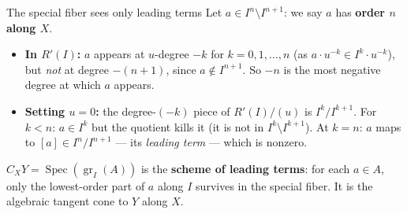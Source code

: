 \documentclass[aspectratio=169,12pt]{beamer}
\newenvironment{mathbox}{%
  \begin{tcolorbox}[mathbox]}{%
  \end{tcolorbox}}
\begin{document}
\begin{frame}{The special fiber sees only leading terms}
  Let $a \in I^n \setminus I^{n+1}$: we say $a$ has \textbf{order $n$ along $X$}.

  \medskip

  \begin{itemize}
    \item \textbf{In $R'(I)$:}\enspace
          $a$ appears at $u$-degree $-k$ for $k = 0, 1, \ldots, n$
          (as $a \cdot u^{-k} \in I^k \cdot u^{-k}$),
          but \emph{not} at degree $-(n+1)$, since $a \notin I^{n+1}$.
          So $-n$ is the most negative degree at which $a$ appears.

    \smallskip

    \item \textbf{Setting $u = 0$:}\enspace
          the degree-$(-k)$ piece of $R'(I)/(u)$ is $I^k/I^{k+1}$.
          For $k < n$: $a \in I^k$ but the quotient kills it (it is not
          in $I^k \setminus I^{k+1}$). At $k = n$: $a$ maps to
          $[a] \in I^n/I^{n+1}$ — its \emph{leading term} — which is nonzero.
  \end{itemize}

  \medskip

  \begin{mathbox}
    $C_X Y = \operatorname{Spec}(\operatorname{gr}_I(A))$ is the
    \textbf{scheme of leading terms}: for each $a \in A$,
    only the lowest-order part of $a$ along $I$ survives in the special fiber.
    It is the algebraic tangent cone to $Y$ along $X$.
  \end{mathbox}
\end{frame}
\end{document}
